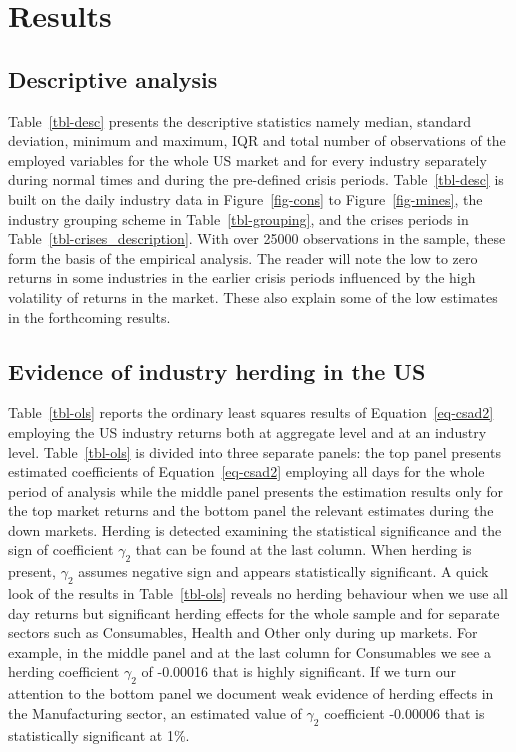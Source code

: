 \documentclass[
  letterpaper,
  DIV=11,
  numbers=noendperiod]{scrartcl}
\begin{document}
\section{Results}\label{results}

\subsection{Descriptive analysis}\label{descriptive-analysis}

Table~\ref{tbl-desc} presents the descriptive statistics namely median,
standard deviation, minimum and maximum, IQR and total number of
observations of the employed variables for the whole US market and for
every industry separately during normal times and during the pre-defined
crisis periods. Table~\ref{tbl-desc} is built on the daily industry data
in Figure~\ref{fig-cons} to Figure~\ref{fig-mines}, the industry
grouping scheme in Table~\ref{tbl-grouping}, and the crises periods in
Table~\ref{tbl-crises_description}. With over 25000 observations in the
sample, these form the basis of the empirical analysis. The reader will
note the low to zero returns in some industries in the earlier crisis
periods influenced by the high volatility of returns in the market.
These also explain some of the low estimates in the forthcoming results.

\subsection{Evidence of industry herding in the
US}\label{evidence-of-industry-herding-in-the-us}

Table~\ref{tbl-ols} reports the ordinary least squares results of
Equation~\ref{eq-csad2} employing the US industry returns both at
aggregate level and at an industry level. Table~\ref{tbl-ols} is divided
into three separate panels: the top panel presents estimated
coefficients of Equation~\ref{eq-csad2} employing all days for the whole
period of analysis while the middle panel presents the estimation
results only for the top market returns and the bottom panel the
relevant estimates during the down markets. Herding is detected
examining the statistical significance and the sign of coefficient
\(\gamma_2\) that can be found at the last column. When herding is
present, \(\gamma_2\) assumes negative sign and appears statistically
significant. A quick look of the results in Table~\ref{tbl-ols} reveals
no herding behaviour when we use all day returns but significant herding
effects for the whole sample and for separate sectors such as
Consumables, Health and Other only during up markets. For example, in
the middle panel and at the last column for Consumables we see a herding
coefficient \(\gamma_2\) of -0.00016 that is highly significant. If we
turn our attention to the bottom panel we document weak evidence of
herding effects in the Manufacturing sector, an estimated value of
\(\gamma_2\) coefficient -0.00006 that is statistically significant at
1\%.
\end{document}

